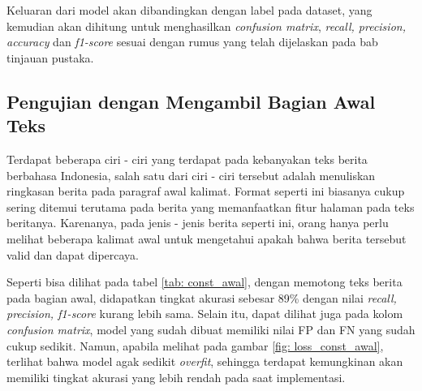 Keluaran dari model akan dibandingkan dengan label pada dataset, yang kemudian akan dihitung untuk menghasilkan \textit{confusion matrix}, \textit{recall, precision, accuracy} dan \textit{f1-score} sesuai dengan rumus yang telah dijelaskan pada bab tinjauan pustaka.

\subsection{Pengujian dengan Mengambil Bagian Awal Teks}

Terdapat beberapa ciri - ciri yang terdapat pada kebanyakan teks berita berbahasa Indonesia, salah satu dari ciri - ciri tersebut adalah menuliskan ringkasan berita pada paragraf awal kalimat. Format seperti ini biasanya cukup sering ditemui terutama pada berita yang memanfaatkan fitur halaman pada teks beritanya. Karenanya, pada jenis - jenis berita seperti ini, orang hanya perlu melihat beberapa kalimat awal untuk mengetahui apakah bahwa berita tersebut valid dan dapat dipercaya.

Seperti bisa dilihat pada tabel \ref{tab: const_awal}, dengan memotong teks berita pada bagian awal, didapatkan tingkat akurasi sebesar 89\% dengan nilai \textit{recall, precision, f1-score} kurang lebih sama. Selain itu, dapat dilihat juga pada kolom \textit{confusion matrix}, model yang sudah dibuat memiliki nilai FP dan FN yang sudah cukup sedikit. Namun, apabila melihat pada gambar \ref{fig: loss_const_awal}, terlihat bahwa model agak sedikit \textit{overfit}, sehingga terdapat kemungkinan akan memiliki tingkat akurasi yang lebih rendah pada saat implementasi.

